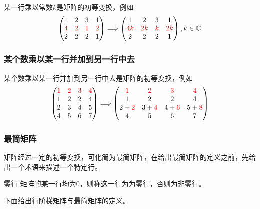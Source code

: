 某一行乘以常数$k$是矩阵的初等变换，例如$$\begin{pmatrix}
	1 & 2 & 3 & 1\\
	\textcolor{red}{4} & \textcolor{red}{2} & \textcolor{red}{1} & \textcolor{red}{2}\\
	2 & 2 & 2 & 1
\end{pmatrix}\Longrightarrow  \begin{pmatrix}
	1 & 2 & 3 & 1\\
	\textcolor{red}{4k} & \textcolor{red}{2k} & \textcolor{red}{k} & \textcolor{red}{2k}\\
	2 & 2 & 2 & 1
\end{pmatrix},k\in \mathbb{C}$$

\subsubsection{某个数乘以某一行并加到另一行中去}

某个数乘以某一行并加到另一行中去是矩阵的初等变换，例如$$\begin{pmatrix}
	\textcolor{red}{1} & \textcolor{red}{2} & \textcolor{red}{3} & \textcolor{red}{4}\\
	1 & 2 & 2 & 4\\
	2 & 3 & 4 & 5\\
	4 & 5 & 6 & 7
\end{pmatrix}\Longrightarrow  \begin{pmatrix}
	\textcolor{red}{1} & \textcolor{red}{2} & \textcolor{red}{3} & \textcolor{red}{4}\\
	1 & 2 & 2 & 4\\
	2+\textcolor{red}{2} & 3+\textcolor{red}{4} & 4+\textcolor{red}{6} & 5+\textcolor{red}{8}\\
	4 & 5 & 6 & 7
\end{pmatrix}$$

\subsubsection{最简矩阵}

矩阵经过一定的初等变换，可化简为最简矩阵，在给出最简矩阵的定义之前，先给出一个术语来描述一个特定行。

\begin{definition}{零行}
	矩阵的某一行均为0，则称这一行为为零行，否则为非零行。
\end{definition}

下面给出行阶梯矩阵与最简矩阵的定义。

